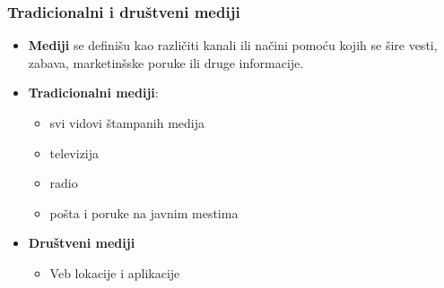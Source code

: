 \documentclass[13pt]{beamer}
\begin{document}
\begin{frame}[fragile]\frametitle{Tradicionalni i društveni mediji}
	\begin{itemize}	
		\item \textbf{Mediji} se definišu kao različiti kanali ili načini pomoću kojih se šire vesti, zabava, marketinšske poruke ili druge informacije.

		\item \textbf{Tradicionalni mediji}:\begin{itemize}
            \item svi vidovi štampanih medija
	    \item televizija
		\item radio
		\item pošta i poruke na javnim mestima
            \end{itemize}
		\item \textbf{Društveni mediji} \begin{itemize}
            \item Veb lokacije i aplikacije
            \end{itemize}
	\end{itemize}

 
\end{frame}
\end{document}
